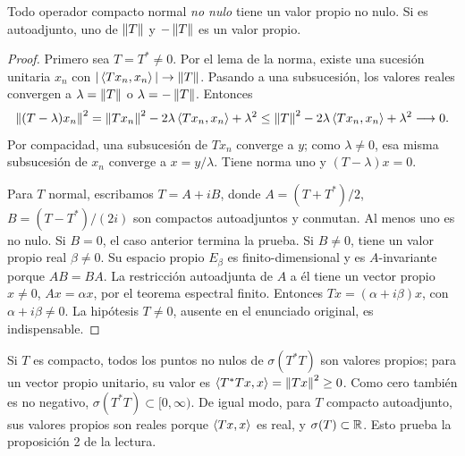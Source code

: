 \begin{teorema}\label{v3:normal-valor-propio}
Todo operador compacto normal \emph{no nulo} tiene un valor propio no nulo. Si es autoadjunto, uno de $\left\lVert T\right\rVert$ y $-\left\lVert T\right\rVert$ es un valor propio.
\end{teorema}
\begin{proof}
Primero sea $T=T^*\ne0$. Por el lema de la norma, existe una sucesión unitaria $x_n$ con $|\left\langle Tx_n,x_n\right\rangle|\to\left\lVert T\right\rVert$. Pasando a una subsucesión, los valores reales convergen a $\lambda=\left\lVert T\right\rVert$ o $\lambda=-\left\lVert T\right\rVert$. Entonces
\[\left\lVert(T-\lambda)x_n\right\rVert^2
=\left\lVert Tx_n\right\rVert^2-2\lambda\left\langle Tx_n,x_n\right\rangle+\lambda^2
\le\left\lVert T\right\rVert^2-2\lambda\left\langle Tx_n,x_n\right\rangle+\lambda^2\longrightarrow0.
\]
Por compacidad, una subsucesión de $Tx_n$ converge a $y$; como $\lambda\ne0$, esa misma subsucesión de $x_n$ converge a $x=y/\lambda$. Tiene norma uno y $(T-\lambda)x=0$.

Para $T$ normal, escribamos $T=A+iB$, donde $A=(T+T^*)/2$, $B=(T-T^*)/(2i)$ son compactos autoadjuntos y conmutan. Al menos uno es no nulo. Si $B=0$, el caso anterior termina la prueba. Si $B\ne0$, tiene un valor propio real $\beta\ne0$. Su espacio propio $E_\beta$ es finito-dimensional y es $A$-invariante porque $AB=BA$. La restricción autoadjunta de $A$ a él tiene un vector propio $x\ne0$, $Ax=\alpha x$, por el teorema espectral finito. Entonces $Tx=(\alpha+i\beta)x$, con $\alpha+i\beta\ne0$. La hipótesis $T\ne0$, ausente en el enunciado original, es indispensable.
\end{proof}
Si $T$ es compacto, todos los puntos no nulos de $\sigma(T^*T)$ son valores propios; para un vector propio unitario, su valor es $\left\langle T^*Tx,x\right\rangle=\left\lVert Tx\right\rVert^2\ge0$. Como cero también es no negativo, $\sigma(T^*T)\subset[0,\infty)$. De igual modo, para $T$ compacto autoadjunto, sus valores propios son reales porque $\left\langle Tx,x\right\rangle$ es real, y $\sigma(T)\subset\mathbb R$. Esto prueba la proposición 2 de la lectura.

